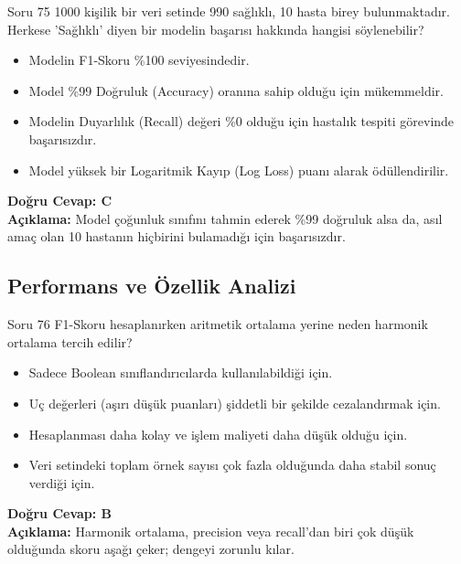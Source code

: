 \documentclass[12pt,a4paper]{article}
\begin{document}
\begin{testcard}{Soru 75}
    1000 kişilik bir veri setinde 990 sağlıklı, 10 hasta birey bulunmaktadır. Herkese 'Sağlıklı' diyen bir modelin başarısı hakkında hangisi söylenebilir?
    \begin{itemize}
        \item[A)] Modelin F1-Skoru \%100 seviyesindedir.
        \item[B)] Model \%99 Doğruluk (Accuracy) oranına sahip olduğu için mükemmeldir.
        \item[C)] Modelin Duyarlılık (Recall) değeri \%0 olduğu için hastalık tespiti görevinde başarısızdır.
        \item[D)] Model yüksek bir Logaritmik Kayıp (Log Loss) puanı alarak ödüllendirilir.
    \end{itemize}
    \tcblower
    \textbf{Doğru Cevap: C} \\
    \textbf{Açıklama:} Model çoğunluk sınıfını tahmin ederek \%99 doğruluk alsa da, asıl amaç olan 10 hastanın hiçbirini bulamadığı için başarısızdır.
\end{testcard}


\newpage
\subsection{Performans ve Özellik Analizi}

\begin{testcard}{Soru 76}
    F1-Skoru hesaplanırken aritmetik ortalama yerine neden harmonik ortalama tercih edilir?
    \begin{itemize}
        \item[A)] Sadece Boolean sınıflandırıcılarda kullanılabildiği için.
        \item[B)] Uç değerleri (aşırı düşük puanları) şiddetli bir şekilde cezalandırmak için.
        \item[C)] Hesaplanması daha kolay ve işlem maliyeti daha düşük olduğu için.
        \item[D)] Veri setindeki toplam örnek sayısı çok fazla olduğunda daha stabil sonuç verdiği için.
    \end{itemize}
    \tcblower
    \textbf{Doğru Cevap: B} \\
    \textbf{Açıklama:} Harmonik ortalama, precision veya recall'dan biri çok düşük olduğunda skoru aşağı çeker; dengeyi zorunlu kılar.
\end{testcard}
\end{document}
